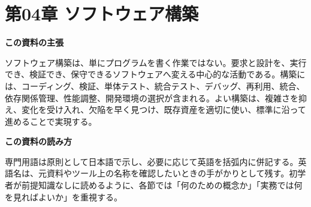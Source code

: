 \section{第04章 ソフトウェア構築}
\noindent\textbf{この資料の主張}

ソフトウェア構築は、単にプログラムを書く作業ではない。要求と設計を、実行でき、検証でき、保守できるソフトウェアへ変える中心的な活動である。構築には、コーディング、検証、単体テスト、統合テスト、デバッグ、再利用、統合、依存関係管理、性能調整、開発環境の選択が含まれる。よい構築は、複雑さを抑え、変化を受け入れ、欠陥を早く見つけ、既存資産を適切に使い、標準に沿って進めることで実現する。

\begin{plainbox}
\textbf{この資料の読み方}

専門用語は原則として日本語で示し、必要に応じて英語を括弧内に併記する。英語名は、元資料やツール上の名称を確認したいときの手がかりとして残す。初学者が前提知識なしに読めるように、各節では「何のための概念か」「実務では何を見ればよいか」を重視する。
\end{plainbox}
